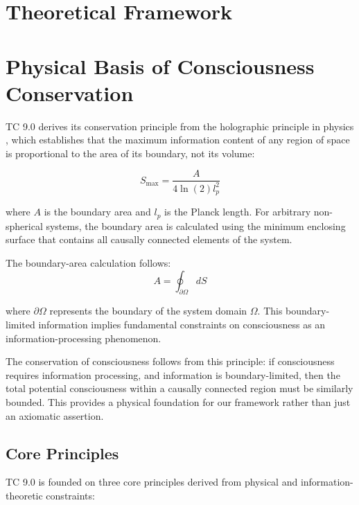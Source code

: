 \documentclass[12pt]{article}
\begin{document}
\section{Theoretical Framework}

\section{Physical Basis of Consciousness Conservation}

TC 9.0 derives its conservation principle from the holographic principle in physics \cite{susskind1995,bousso2002}, which establishes that the maximum information content of any region of space is proportional to the area of its boundary, not its volume:

\begin{equation}
S_{\text{max}} = \frac{A}{4\ln(2)l_p^2}
\end{equation}

where $A$ is the boundary area and $l_p$ is the Planck length. For arbitrary non-spherical systems, the boundary area is calculated using the minimum enclosing surface that contains all causally connected elements of the system.

The boundary-area calculation follows:
\begin{equation}
A = \oint_{\partial \Omega} dS
\end{equation}

where $\partial \Omega$ represents the boundary of the system domain $\Omega$. This boundary-limited information implies fundamental constraints on consciousness as an information-processing phenomenon.

The conservation of consciousness follows from this principle: if consciousness requires information processing, and information is boundary-limited, then the total potential consciousness within a causally connected region must be similarly bounded. This provides a physical foundation for our framework rather than just an axiomatic assertion.

\subsection{Core Principles}
TC 9.0 is founded on three core principles derived from physical and information-theoretic constraints:
\end{document}
